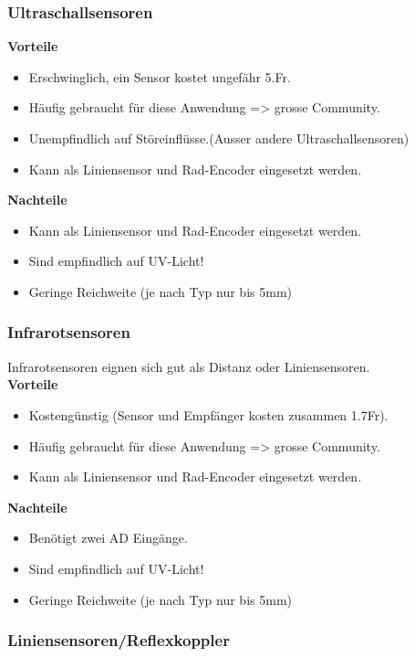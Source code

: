 \subsubsection{Ultraschallsensoren}
\textbf {Vorteile}
\begin{itemize}
\item Erschwinglich, ein Sensor kostet ungefähr 5.Fr.
\item Häufig gebraucht für diese Anwendung => grosse Community.
\item Unempfindlich auf Störeinflüsse.(Ausser andere Ultraschallsensoren)
\item Kann als Liniensensor und Rad-Encoder eingesetzt werden.\\
\end{itemize}
\textbf {Nachteile}
\begin{itemize}
\item Kann als Liniensensor und Rad-Encoder eingesetzt werden.
\item Sind empfindlich auf UV-Licht!
\item Geringe Reichweite (je nach Typ nur bis 5mm)
\end{itemize}
\subsubsection{Infrarotsensoren}
Infrarotsensoren eignen sich gut als Distanz oder Liniensensoren.\\
\textbf {Vorteile}
\begin{itemize}
\item Kostengünstig (Sensor und Empfänger kosten zusammen 1.7Fr).
\item Häufig gebraucht für diese Anwendung => grosse Community.
\item Kann als Liniensensor und Rad-Encoder eingesetzt werden.\\
\end{itemize}
\textbf {Nachteile}
\begin{itemize}
\item Benötigt zwei AD Eingänge.
\item Sind empfindlich auf UV-Licht!
\item Geringe Reichweite (je nach Typ nur bis 5mm)
\end{itemize}

\subsubsection{Liniensensoren/Reflexkoppler}

